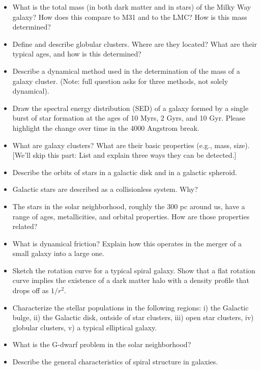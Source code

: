 \documentclass[12pt]{article}
\begin{document}
\begin{itemize}
\item What is the total mass (in both dark matter and in stars) of the
  Milky Way galaxy? How does this compare to M31 and to the LMC? How
  is this mass determined?
\item Define and describe globular clusters. Where are they located?
  What are their typical ages, and how is this determined?
\item Describe a dynamical method used in the determination of the
  mass of a galaxy cluster. (Note: full question asks for three
  methods, not solely dynamical).
\item Draw the spectral energy distribution (SED) of a galaxy formed
  by a single burst of star formation at the ages of 10 Myrs, 2 Gyrs,
  and 10 Gyr. Please highlight the change over time in the 4000
  Angstrom break.
\item What are galaxy clusters? What are their basic properties (e.g.,
  mass, size). [We'll skip this part: List and explain three ways they
    can be detected.]
\item Describe the orbits of stars in a galactic disk and in a
  galactic spheroid.
\item Galactic stars are described as a collisionless system. Why?
\item The stars in the solar neighborhood, roughly the 300 pc around
  us, have a range of ages, metallicities, and orbital properties. How
  are those properties related?
\item What is dynamical friction? Explain how this operates in the
  merger of a small galaxy into a large one.
\item Sketch the rotation curve for a typical spiral galaxy. Show that
  a flat rotation curve implies the existence of a dark matter halo
  with a density profile that drops off as $1/r^2$.
\item Characterize the stellar populations in the following regions:
  i) the Galactic bulge, ii) the Galactic disk, outside of star
  clusters, iii) open star clusters, iv) globular clusters, v) a
  typical elliptical galaxy.
\item What is the G-dwarf problem in the solar neighborhood?
\item Describe the general characteristics of spiral structure in
  galaxies.
\end{itemize}
\end{document}
